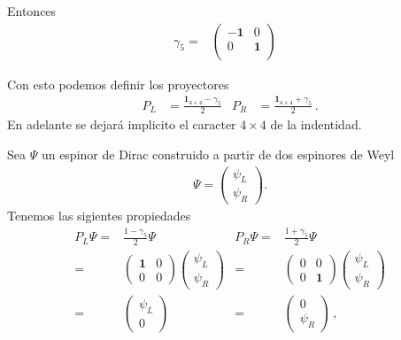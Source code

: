 \begin{frame}
Entonces
\begin{align}
  \gamma_5=&
  \begin{pmatrix}
    -\mathbf{1} & 0\\
    0  & \mathbf{1}\\
  \end{pmatrix}& 
\end{align}

Con esto podemos definir los proyectores
\begin{align}
  P_L&=\frac{\mathbf{1}_{4\times4}-\gamma_5}{2} & P_R&=\frac{\mathbf{1}_{4\times4}+\gamma_5}{2}\,.
\end{align}
En adelante se dejará implicito el caracter $4\times4$ de la indentidad. 

Sea $\Psi$ un espinor de Dirac construido a partir de dos espinores de Weyl
\begin{align}
  \Psi=
  \begin{pmatrix}
   \psi_L\\
    \psi_R
  \end{pmatrix}.
\end{align}
Tenemos las sigientes propiedades
\begin{align}
   P_L \Psi=& \frac{1-\gamma_5}{2}\Psi & P_R \Psi=& \frac{1+\gamma_5}{2}\Psi \nonumber\\
   =&
   \begin{pmatrix}
    \mathbf{1} & 0 \\
     0 & 0
   \end{pmatrix} \begin{pmatrix}
   \psi_L\\
    \psi_R
  \end{pmatrix} & =&\begin{pmatrix}
    0 & 0 \\
     0 & \mathbf{1}
   \end{pmatrix} \begin{pmatrix}
   \psi_L\\
    \psi_R
  \end{pmatrix}\nonumber\\
  =& \begin{pmatrix}
   \psi_L\\
    0
  \end{pmatrix} & =& \begin{pmatrix}
   0\\
    \psi_R
  \end{pmatrix}\,,
\end{align}

\end{frame}
